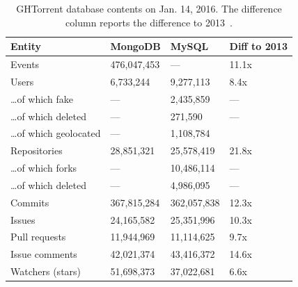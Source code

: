 \documentclass{sig-alternate}
\begin{document}
\begin{table}
  \centering
  \begin{small}
  \label{tab:datasetsize}
  \begin{tabular}{llll}
    \hline
    \bfseries{Entity} & \bfseries{MongoDB} & \bfseries{MySQL} & \bfseries{Diff to 2013} \\
    \hline
      Events                     & 476,047,453 & ---           & 11.1x\\
      Users                      & 6,733,244   & 9,277,113     & 8.4x \\
      \ldots of which fake       & ---         & 2,435,859     & ---\\
      \ldots of which deleted    & ---         & 271,590       & ---\\
      \ldots of which geolocated & ---         & 1,108,784     & \\
      Repositories               & 28,851,321  & 25,578,419    & 21.8x\\
      \ldots of which forks      & ---         & 10,486,114    & --- \\
      \ldots of which deleted    & ---         & 4,986,095     & ---\\
      Commits                    & 367,815,284 & 362,057,838   & 12.3x \\
      Issues                     & 24,165,582  & 25,351,996    & 10.3x \\
      Pull requests              & 11,944,969  & 11,114,625    & 9.7x \\
      Issue comments             & 42,021,374  & 43,416,372    & 14.6x\\
      Watchers (stars)           & 51,698,373  & 37,022,681    & 6.6x\\
      \hline
    \end{tabular}

    \caption{GHTorrent database contents on Jan. 14, 2016. The difference column reports the difference to 2013~\cite{Gousi13}.}
  \end{small}
  \label{tab:stats}
\end{table}
\end{document}
